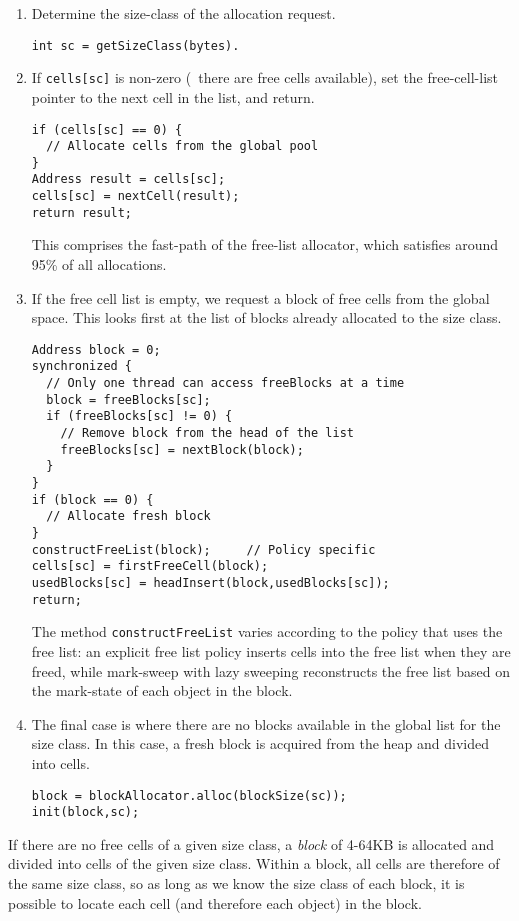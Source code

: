 \begin{enumerate}
  \item Determine the size-class of the allocation request. 
  \begin{lstlisting}
int sc = getSizeClass(bytes).
  \end{lstlisting}
  \item If \lstinline|cells[sc]| is non-zero (\ie\ there are free cells
  available), set the free-cell-list pointer to the next cell in the list, and
  return.
  \begin{lstlisting}
if (cells[sc] == 0) {
  // Allocate cells from the global pool
}
Address result = cells[sc];
cells[sc] = nextCell(result);
return result;
  \end{lstlisting}
  This comprises the fast-path of the free-list allocator, which satisfies
  around 95\% of all allocations.
  \item If the free cell list is empty, we request a block of free cells from
  the global space.  This looks first at the list of blocks already allocated to
  the size class.
    \begin{lstlisting}
Address block = 0;
synchronized {
  // Only one thread can access freeBlocks at a time
  block = freeBlocks[sc];
  if (freeBlocks[sc] != 0) {
    // Remove block from the head of the list
    freeBlocks[sc] = nextBlock(block);
  }
}
if (block == 0) {
  // Allocate fresh block
}
constructFreeList(block);     // Policy specific
cells[sc] = firstFreeCell(block);
usedBlocks[sc] = headInsert(block,usedBlocks[sc]);
return;
  \end{lstlisting}
  The method \lstinline|constructFreeList| varies according to the policy that
  uses the free list: an explicit free list policy inserts cells into the free
  list when they are freed, while mark-sweep with lazy sweeping reconstructs the
  free list based on the mark-state of each object in the block.
  \item The final case is where there are no blocks available in the global list
  for the size class.  In this case, a fresh block is acquired from the heap and
  divided into cells.
      \begin{lstlisting}
block = blockAllocator.alloc(blockSize(sc));
init(block,sc);
      \end{lstlisting}
  \end{enumerate} %

  If there are no free cells
of a given size class, a \emph{block} of 4-64KB is allocated and divided into
cells of the given size class.  Within a block, all cells are therefore of the
same size class, so as long as we know the size class of each
block, it is possible to locate each cell (and therefore each object) 
in the block.

